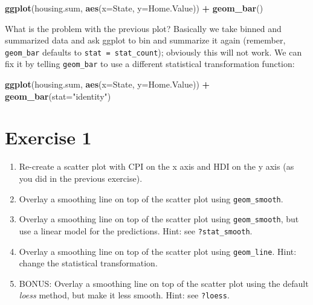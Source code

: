 \documentclass[]{book}
\newenvironment{Shaded}{\begin{snugshade}}{\end{snugshade}}
\newcommand{\KeywordTok}[1]{\textcolor[rgb]{0.13,0.29,0.53}{\textbf{#1}}}
\newcommand{\DataTypeTok}[1]{\textcolor[rgb]{0.13,0.29,0.53}{#1}}
\newcommand{\StringTok}[1]{\textcolor[rgb]{0.31,0.60,0.02}{#1}}
\newcommand{\OperatorTok}[1]{\textcolor[rgb]{0.81,0.36,0.00}{\textbf{#1}}}
\newcommand{\NormalTok}[1]{#1}
\providecommand{\tightlist}{%
  \setlength{\itemsep}{0pt}\setlength{\parskip}{0pt}}
\begin{document}
\begin{Shaded}
\begin{Highlighting}[]
\KeywordTok{ggplot}\NormalTok{(housing.sum, }\KeywordTok{aes}\NormalTok{(}\DataTypeTok{x=}\NormalTok{State, }\DataTypeTok{y=}\NormalTok{Home.Value)) }\OperatorTok{+}\StringTok{ }
\StringTok{  }\KeywordTok{geom_bar}\NormalTok{()}
\end{Highlighting}
\end{Shaded}

What is the problem with the previous plot? Basically we take binned and
summarized data and ask ggplot to bin and summarize it again (remember,
\texttt{geom\_bar} defaults to \texttt{stat\ =\ stat\_count}); obviously
this will not work. We can fix it by telling \texttt{geom\_bar} to use a
different statistical transformation function:

\begin{Shaded}
\begin{Highlighting}[]
\KeywordTok{ggplot}\NormalTok{(housing.sum, }\KeywordTok{aes}\NormalTok{(}\DataTypeTok{x=}\NormalTok{State, }\DataTypeTok{y=}\NormalTok{Home.Value)) }\OperatorTok{+}\StringTok{ }
\StringTok{  }\KeywordTok{geom_bar}\NormalTok{(}\DataTypeTok{stat=}\StringTok{"identity"}\NormalTok{)}
\end{Highlighting}
\end{Shaded}

\section{Exercise 1}\label{exercise-1-2}

\begin{enumerate}
\def\labelenumi{\arabic{enumi}.}
\tightlist
\item
  Re-create a scatter plot with CPI on the x axis and HDI on the y axis
  (as you did in the previous exercise).
\item
  Overlay a smoothing line on top of the scatter plot using
  \texttt{geom\_smooth}.
\item
  Overlay a smoothing line on top of the scatter plot using
  \texttt{geom\_smooth}, but use a linear model for the predictions.
  Hint: see \texttt{?stat\_smooth}.
\item
  Overlay a smoothing line on top of the scatter plot using
  \texttt{geom\_line}. Hint: change the statistical transformation.
\item
  BONUS: Overlay a smoothing line on top of the scatter plot using the
  default \emph{loess} method, but make it less smooth. Hint: see
  \texttt{?loess}.
\end{enumerate}
\end{document}
